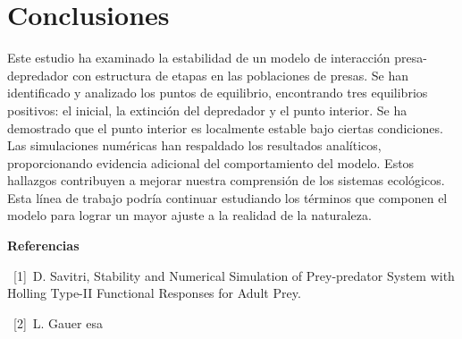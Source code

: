 \documentclass{wscpaperproc}
\theoremstyle{wsc}
\begin{document}
\section*{Conclusiones}

Este estudio ha examinado la estabilidad de un modelo de interacción presa-depredador con estructura
de etapas en las poblaciones de presas. Se han identificado y analizado los puntos de equilibrio,
encontrando tres equilibrios positivos: el inicial, la extinción del depredador y el punto interior.
Se ha demostrado que el punto interior es localmente estable bajo ciertas condiciones. Las simulaciones
numéricas han respaldado los resultados analíticos, proporcionando evidencia adicional del comportamiento
del modelo. Estos hallazgos contribuyen a mejorar nuestra comprensión de los sistemas ecológicos. Esta línea de trabajo
podría continuar estudiando los términos que componen el modelo para lograr un mayor ajuste a la realidad de la
naturaleza.


\vspace*{3cm}

{\bf \Large Referencias}

\ [1]\ {D. Savitri, Stability and Numerical Simulation of Prey-predator System with Holling
Type-II Functional Responses for Adult Prey}.

\ [2]\ {L. Gauer esa}
\end{document}
